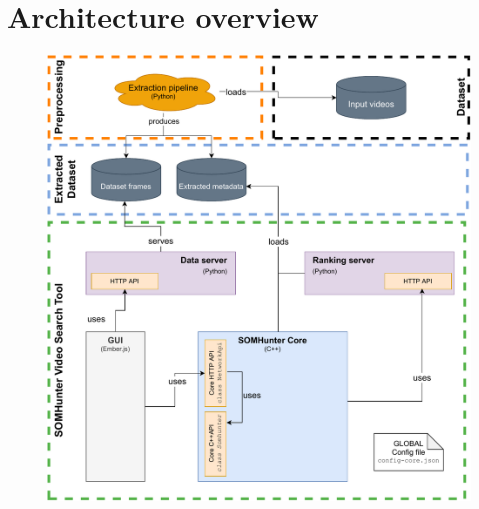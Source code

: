 \chapter{Architecture overview}
\label{arch}


\begin{figure}
	\centering
	\includegraphics[width=\textwidth]{img/diagrams/sh-arch.pdf}
	\label{fig:sh-arch}
\end{figure}
